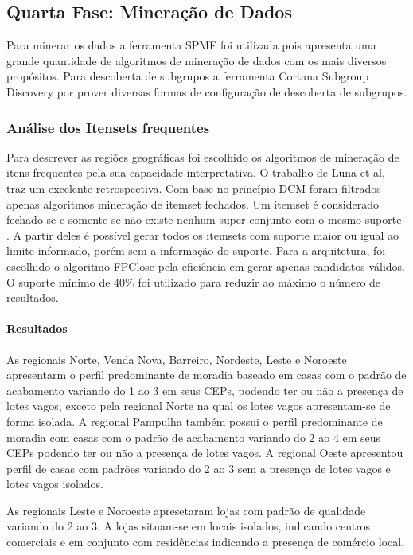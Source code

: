 \documentclass[12pt]{article}
\begin{document}
 \subsection{Quarta Fase: Mineração de Dados}
 Para minerar os dados a ferramenta SPMF \cite{SPMF} foi utilizada pois apresenta uma grande quantidade de algoritmos de mineração de dados com os mais diversos propósitos. Para descoberta de subgrupos a ferramenta Cortana Subgroup Discovery \cite{meeng2011flexible} por prover diversas formas de configuração de descoberta de subgrupos.
 \subsubsection{Análise dos Itensets frequentes}
 Para descrever as regiões geográficas foi escolhido os algoritmos de mineração de itens frequentes pela sua capacidade interpretativa. O trabalho de Luna et al\cite{luna2019frequent}, traz um excelente retrospectiva. Com base no princípio DCM foram filtrados apenas algoritmos mineração de itemset fechados. Um itemset é considerado fechado se e somente se não existe nenhum super conjunto com o mesmo suporte \cite{lucchese2004mining}. A partir deles é possível gerar todos os itemsets com suporte maior ou igual ao limite informado, porém sem a informação do suporte. Para a arquitetura, foi escolhido o algoritmo FPClose \cite{grahne2005fast} pela eficiência em gerar apenas candidatos válidos. O suporte mínimo de 40\% foi utilizado para reduzir ao máximo o número de resultados.
 
\paragraph{Resultados}
As regionais Norte, Venda Nova, Barreiro, Nordeste, Leste e Noroeste apresentarm o perfil predominante de moradia baseado em casas com o padrão de acabamento variando do 1 ao 3 em seus CEPs, podendo ter ou não a presença de lotes vagos, exceto pela regional Norte na qual os lotes vagos apresentam-se de forma isolada. A regional Pampulha também possui o perfil predominante de moradia com casas com o padrão de acabamento variando do 2 ao 4 em seus CEPs podendo ter ou não a presença de lotes vagos. A regional Oeste apresentou perfil de casas com padrões variando do 2 ao 3 sem a presença de lotes vagos e lotes vagos isolados.

As regionais Leste e Noroeste apresetaram lojas com padrão de qualidade variando do 2 ao 3. A lojas situam-se em locais isolados, indicando centros comerciais e em conjunto com residências indicando a presença de comércio local.
\end{document}
